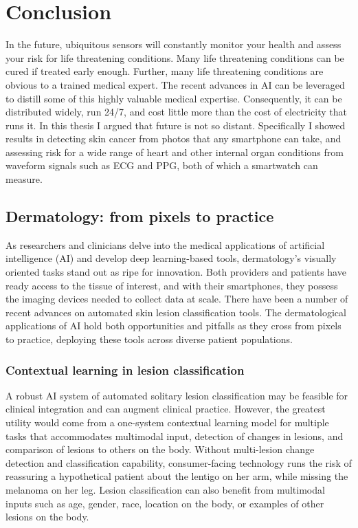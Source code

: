 \chapter{Conclusion}
In the future, ubiquitous sensors will constantly monitor your health and assess your risk for life threatening conditions.  Many life threatening conditions can be cured if treated early enough.  Further, many life threatening conditions are obvious to a trained medical expert.  The recent advances in AI can be leveraged to distill some of this highly valuable medical expertise.  Consequently, it can be distributed widely, run 24/7, and cost little more than the cost of electricity that runs it.  In this thesis I argued that future is not so distant.  Specifically I showed results in detecting skin cancer from photos that any smartphone can take, and assessing risk for a wide range of heart and other internal organ conditions from waveform signals such as ECG and PPG, both of which a smartwatch can measure.

\section{Dermatology: from pixels to practice}
As researchers and clinicians delve into the medical applications of artificial intelligence (AI) and develop deep learning-based tools, dermatology's visually oriented tasks stand out as ripe for innovation. Both providers and patients have ready access to the tissue of interest, and with their smartphones, they possess the imaging devices needed to collect data at scale. There have been a number of recent advances on automated skin lesion classification tools. The dermatological applications of AI hold both opportunities and pitfalls as they cross from pixels to practice, deploying these tools across diverse patient populations.

\subsection{Contextual learning in lesion classification}
A robust AI system of automated solitary lesion classification may be feasible for clinical integration and can augment clinical practice. However, the greatest utility would come from a one-system contextual learning model for multiple tasks that accommodates multimodal input, detection of changes in lesions, and comparison of lesions to others on the body. Without multi-lesion change detection and classification capability, consumer-facing technology runs the risk of reassuring a hypothetical patient about the lentigo on her arm, while missing the melanoma on her leg. Lesion classification can also benefit from multimodal inputs such as age, gender, race, location on the body, or examples of other lesions on the body.

